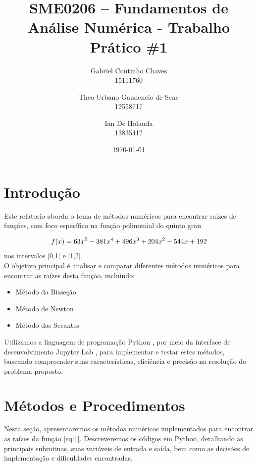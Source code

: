 \documentclass{article}
\title{\textbf{SME0206 -- Fundamentos de An\'{a}lise Num\'{e}rica - Trabalho Pr\'{a}tico \#1}}
\author{Gabriel Coutinho Chaves \\ 15111760 \and Theo Urbano Gaudencio de Sene \\ 12558717 \and Ian De Holanda \\ 13835412}
\date{\today}
\begin{document}
\maketitle


\section{Introdu\c{c}\~{a}o}
Este relatorio aborda o tema de m\'{e}todos num\'{e}ricos para encontrar ra\'{i}zes de fun\c{c}\~{o}es, com foco espec\'{i}fico na fun\c{c}\~{a}o polinomial do quinto grau


\begin{equation}
    f(x) = 63x^5 - 381x^4 + 496x^3 + 204x^2 - 544x + 192
\label{eq:1}
\vspace*{4pt}
\end{equation}
nos intervalos [0,1] e [1,2].\\
O objetivo principal \'{e} analisar e comparar diferentes m\'{e}todos num\'{e}ricos para encontrar as ra\'{i}zes desta fun\c{c}\~{a}o, incluindo:

\begin{itemize}
    \item M\'{e}todo da Bisse\c{c}\~{a}o
    \item M\'{e}todo de Newton
    \item M\'{e}todo das Secantes
\end{itemize}

Utilizamos a linguagem de programa\c{c}\~{a}o Python \cite{python}, por meio da interface de desenvolvimento Jupyter Lab \cite{jupyter}, para implementar e testar estes m\'{e}todos, buscando compreender suas caracter\'{i}sticas, efici\^{e}ncia e precis\~{a}o na resolu\c{c}\~{a}o do problema proposto.




\section{M\'{e}todos e Procedimentos}
Nesta se\c{c}\~{a}o, apresentaremos os m\'{e}todos num\'{e}ricos implementados para encontrar as ra\'{i}zes da fun\c{c}\~{a}o \eqref{eq:1}. Descreveremos os c\'{o}digos em Python, detalhando as principais subrotinas, suas vari\'{a}veis de entrada e sa\'{i}da, bem como as decis\~{o}es de implementa\c{c}\~{a}o e dificuldades encontradas.
\end{document}
